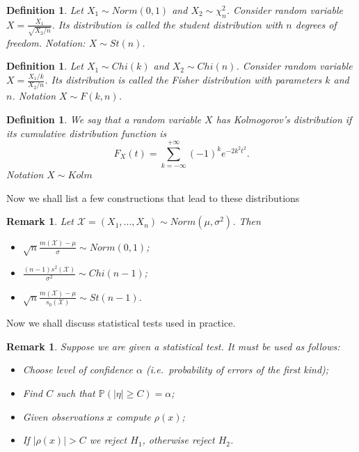 \documentclass[12pt]{article}
\newtheorem{remark}[theorem]{Remark}
\newtheorem{definition}[theorem]{Definition}
\begin{document}
\begin{definition} Let $X_1\sim Norm(0, 1)$ and $X_2\sim \chi_n^2$. Consider
    random variable $X=\frac{X_1}{\sqrt{X_2/n}}$. Its distribution is called the
    student distribution with $n$ degrees of freedom. Notation: $X\sim St(n)$.
\end{definition}

\begin{definition} Let $X_1\sim Chi(k)$ and $X_2\sim Chi(n)$. Consider random
    variable $X=\frac{X_1/k}{X_2/n}$. Its distribution is called the Fisher
    distribution with parameters $k$ and $n$. Notation $X\sim F(k,n)$.
\end{definition}

\begin{definition} We say that a random variable $X$ has Kolmogorov's
    distribution if its cumulative distribution function is
    $$
        F_X(t)=\sum_{k=-\infty}^{+\infty} {(-1)}^k e^{-2k^2t^2}.
    $$
    Notation $X\sim Kolm$
\end{definition}

Now we shall list a few constructions that lead to these distributions

\begin{remark} Let $\mathscr{X}=(X_1,\ldots, X_n)\sim Norm(\mu,\sigma^2)$. Then
    \begin{itemize}
        \item $\sqrt{n}\frac{m(\mathscr{X})-\mu}{\sigma}\sim Norm(0,1)$;
        \item $\frac{(n-1)s^2(\mathscr{X})}{\sigma^2}\sim Chi(n-1)$;
        \item $\sqrt{n}\frac{m(\mathscr{X})-\mu}{s_0(\mathscr{X})}\sim St(n-1)$.
    \end{itemize}
\end{remark}

Now we shall discuss statistical tests used in practice.

\begin{remark}
    Suppose we are given a statistical test. It must be used as follows:
    \begin{itemize}
        \item Choose level of confidence $\alpha$ (i.e.\ probability of errors
              of the first kind);
        \item Find $C$ such that $\mathbb{P}(|\eta|\geq C)=\alpha$;
        \item Given observations $x$ compute $\rho(x)$;
        \item If $|\rho(x)|>C$ we reject $H_1$, otherwise reject $H_2$.
    \end{itemize}
\end{remark}
\end{document}
